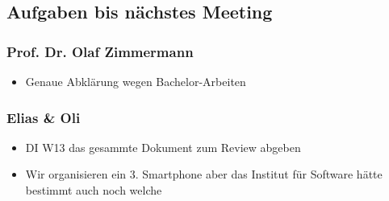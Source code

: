 \hypertarget{aufgaben-bis-nachstes-meeting}{%
\subsection*{Aufgaben bis nächstes
Meeting}\label{aufgaben-bis-nachstes-meeting}}

\hypertarget{prof.-dr.-olaf-zimmermann}{%
\subsubsection*{Prof. Dr. Olaf
Zimmermann}\label{prof.-dr.-olaf-zimmermann}}

\begin{itemize}

\item
  Genaue Abklärung wegen Bachelor-Arbeiten
\end{itemize}

\hypertarget{elias-ux5cux26-oli}{%
\subsubsection*{Elias \& Oli}\label{elias-ux5cux26-oli}}

\begin{itemize}

\item
  DI W13 das gesammte Dokument zum Review abgeben
\item
  Wir organisieren ein 3. Smartphone aber das Institut für Software
  hätte bestimmt auch noch welche
\end{itemize}